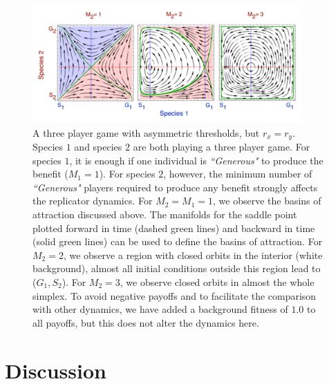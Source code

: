 \documentclass[a4paper]{scrartcl}
\begin{document}
\begin{figure}[h]
\begin{center}
\includegraphics[width=\linewidth]{standardreplicator.eps}
\end{center}
\caption{
A three player game with asymmetric thresholds, but $r_x=r_y$.
Species $1$ and species $2$ are both playing a three player game.
For species $1$, it is enough if one individual is \textit{``Generous"} to produce the benefit ($M_1 = 1$).
For species $2$, however, the minimum number of \textit{``Generous"} players required to produce any benefit 
strongly affects the replicator dynamics. 
For $M_2=M_1=1$, we observe the basins of attraction discussed above. 
The manifolds for the saddle point plotted forward in time (dashed green lines) and backward in time (solid green lines) can be used to define the basins of attraction.
For $M_2=2$, we observe a region with closed orbits in the interior (white background), almost all initial conditions outside this region lead to ($G_1,S_2$). 
For $M_2=3$, we observe closed orbits in almost the whole simplex. 
To avoid negative payoffs and to facilitate the comparison with other dynamics, we have added a background fitness of  $1.0$ to all payoffs, but this does not alter the dynamics here.
}
\label{fig:thresholdsrep}
\end{figure}

\section*{Discussion}
\end{document}
